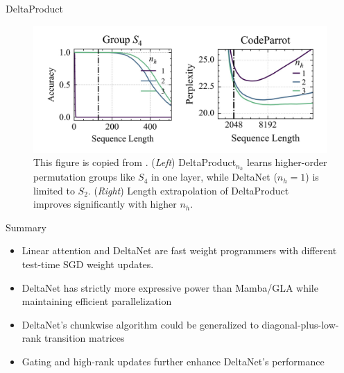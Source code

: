 \begin{frame}{DeltaProduct}
    \begin{figure}
        \centering
        \includegraphics[width=0.9\linewidth]{figure/deltaproduct.jpg}
        \vspace{-4mm}
        \caption{This figure is copied from \cite{siems2025deltaproductincreasingexpressivitydeltanet}.  (\textit{Left}) DeltaProduct$_{n_h}$ learns higher-order permutation groups like $S_4$ in one layer, while DeltaNet ($n_h = 1$) is limited to $S_2$. (\textit{Right}) Length extrapolation of DeltaProduct improves significantly with higher $n_h$.}
    \end{figure}
    
\end{frame}

\begin{frame}{Summary}
    \begin{itemize}
        \item Linear attention and DeltaNet are {\color{red}fast weight programmers} with different {\color{red}test-time SGD} weight updates.
        \item DeltaNet has {\color{red}strictly more expressive power} than Mamba/GLA while {\color{red}maintaining efficient parallelization}
        \item DeltaNet's chunkwise algorithm could be generalized to {\color{red} diagonal-plus-low-rank transition matrices}
        \item {\color{red}Gating} and {\color{red}high-rank updates} further enhance DeltaNet's performance
    \end{itemize}
\end{frame}
